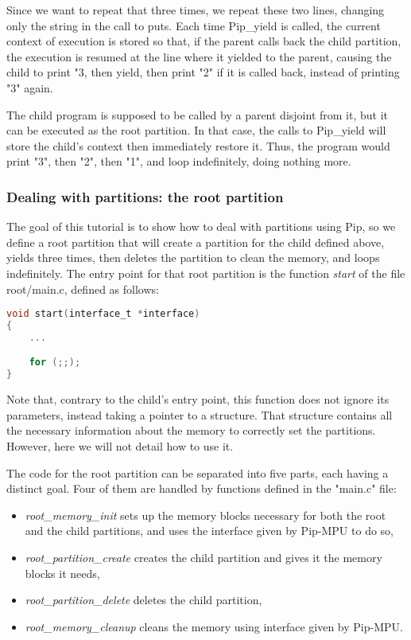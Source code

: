 \documentclass[10pt,a4paper,titlepage]{refart}
\begin{document}
Since we want to repeat that three times, we repeat these two lines, changing only the string in the call to puts. Each time Pip\_yield is 
called, the current context of execution is stored so that, if the parent calls back the child partition, the execution is resumed at the 
line where it yielded to the parent, causing the child to print "3, then yield, then print "2" if it is called back, instead of printing "3" 
again.


The child program is supposed to be called by a parent disjoint from it, but it can be executed as the root partition. In that case, the 
calls to Pip\_yield will store the child's context then immediately restore it. Thus, the program would print "3", then "2", then "1", and 
loop indefinitely, doing nothing more. %

\subsubsection{Dealing with partitions: the root partition}

The goal of this tutorial is to show how to deal with partitions using Pip, so we define a root partition that will create a partition for 
the child defined above, yields three times, then deletes the partition to clean the memory, and loops indefinitely. The entry point for 
that root partition is the function \textit{start} of the file root/main{.}c, defined as follows:
\begin{lstlisting}[language=C]
void start(interface_t *interface)
{
    ...

    for (;;);
}
\end{lstlisting}
Note that, contrary to the child's entry point, this function does not ignore its parameters, instead taking a pointer to a structure. That 
structure contains all the necessary information about the memory to correctly set the partitions. However, here we will not detail how to 
use it.

The code for the root partition can be separated into five parts, each having a distinct goal. Four of them are handled by functions 
defined in the "main{.}c" file:
\begin{itemize}
    \item \textit{root\_memory\_init} sets up the memory blocks necessary for both the root and the child partitions, and uses the 
    interface given by Pip-MPU to do so,
    \item \textit{root\_partition\_create} creates the child partition and gives it the memory blocks it needs,
    \item \textit{root\_partition\_delete} deletes the child partition,
    \item \textit{root\_memory\_cleanup} cleans the memory using interface given by Pip-MPU.
\end{itemize}
\end{document}
